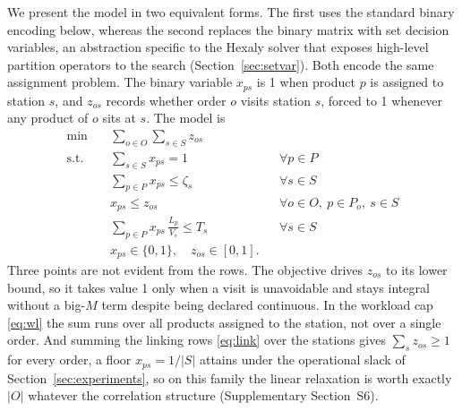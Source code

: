 \documentclass[]{interact}
\begin{document}
We present the model in two equivalent forms. The first uses the standard binary encoding below, whereas the second replaces the binary matrix with set decision variables, an abstraction specific to the Hexaly solver \citep{blaisemodeling} that exposes high-level partition operators to the search (Section~\ref{sec:setvar}). Both encode the same assignment problem. The binary variable $x_{ps}$ is 1 when product $p$ is assigned to station $s$, and $z_{os}$ records whether order $o$ visits station $s$, forced to 1 whenever any product of $o$ sits at $s$. The model is
\begin{align}
\min \quad & \sum_{o \in O} \sum_{s \in S} z_{os} \label{eq:obj}\\
\text{s.t.} \quad
& \sum_{s \in S} x_{ps} = 1 && \forall p \in P \label{eq:assign}\\
& \sum_{p \in P} x_{ps} \le \zeta_s && \forall s \in S \label{eq:cap}\\
& x_{ps} \le z_{os} && \forall o \in O,\ p \in P_o,\ s \in S \label{eq:link}\\
& \sum_{p \in P} x_{ps}\,\frac{L_p}{V_s} \le T_s && \forall s \in S \label{eq:wl}\\
& x_{ps} \in \{0,1\},\quad z_{os} \in [0,1]. && \label{eq:dom}
\end{align}
Three points are not evident from the rows. The objective drives $z_{os}$ to its lower bound, so it takes value 1 only when a visit is unavoidable and stays integral without a big-$M$ term despite being declared continuous. In the workload cap \eqref{eq:wl} the sum runs over all products assigned to the station, not over a single order. And summing the linking rows \eqref{eq:link} over the stations gives $\sum_{s} z_{os}\ge 1$ for every order, a floor $x_{ps}=1/|S|$ attains under the operational slack of Section~\ref{sec:experiments}, so on this family the linear relaxation is worth exactly $|O|$ whatever the correlation structure (Supplementary Section~S6).
\end{document}
